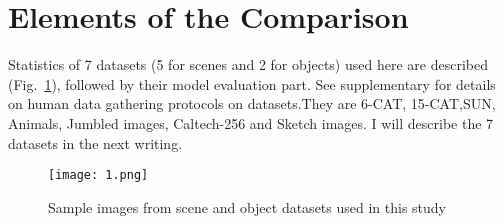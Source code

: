 \documentclass[10pt,twocolumn,letterpaper]{article}
\begin{document}
\section{Elements of the Comparison}
Statistics of 7 datasets (5 for scenes and 2 for objects)
used here are described (Fig.~\ref{fig1}), followed
by their model evaluation part. See supplementary for details on human data gathering protocols on datasets.They are 6-CAT, 15-CAT,SUN, Animals, Jumbled images, Caltech-256 and Sketch images. I will describe the 7 datasets in the next writing.
\begin{figure}[t]
  \centering
  \texttt{[image: 1.png]}\\
  \caption{Sample images from scene and object datasets used in this study}
  \label{fig1}
\end{figure}

{\small


}

 
\end{document}
